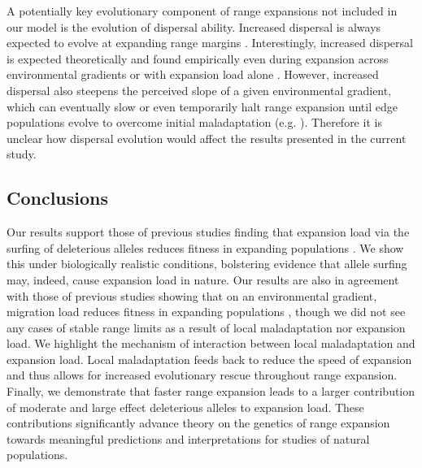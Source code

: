 A potentially key evolutionary component of range expansions not included in our model is the evolution of dispersal ability. Increased dispersal is always expected to evolve at expanding range margins \citep{Hargreaves:2014}. Interestingly, increased dispersal is expected theoretically and found empirically even during expansion across environmental gradients or with expansion load alone \citep{Henry:2015b}. However, increased dispersal also steepens the perceived slope of a given environmental gradient, which can eventually slow or even temporarily halt range expansion until edge populations evolve to overcome initial maladaptation (e.g. \citealt{Phillips:2012}). Therefore it is unclear how dispersal evolution would affect the results presented in the current study.


\subsection{Conclusions}

Our results support those of previous studies finding that expansion load via the surfing of deleterious alleles reduces fitness in expanding populations \citep{Peischl:2013, Peischl:2015, Peischl:2015b}. We show this under biologically realistic conditions, bolstering evidence that allele surfing may, indeed, cause expansion load in nature. Our results are also in agreement with those of previous studies showing that on an environmental gradient, migration load reduces fitness in expanding populations \citep{Kirkpatrick:1997, Bridle:2010, Polechova:2015}, though we did not see any cases of stable range limits as a result of local maladaptation nor expansion load. We highlight the mechanism of interaction between local maladaptation and expansion load. Local maladaptation feeds back to reduce the speed of expansion and thus allows for increased evolutionary rescue throughout range expansion. Finally, we demonstrate that faster range expansion leads to a larger contribution of moderate and large effect deleterious alleles to expansion load. These contributions significantly advance theory on the genetics of range expansion towards meaningful predictions and interpretations for studies of natural populations.




